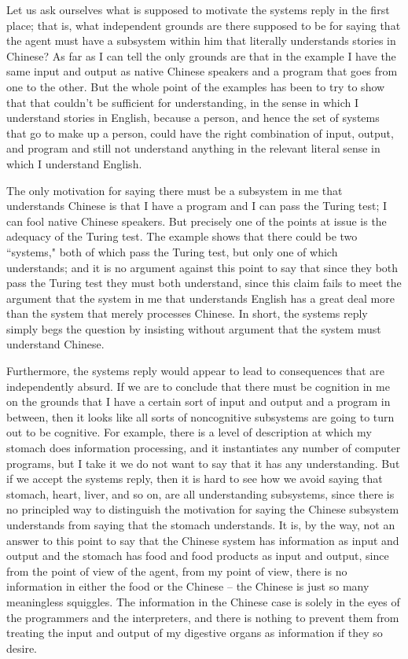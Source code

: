 Let us ask ourselves what is supposed to motivate the systems reply in the first place; that is, what independent
grounds are there supposed to be for saying that the agent must have a subsystem within him that literally
understands stories in Chinese? As far as I can tell the only grounds are that in the example I have the same
input and output as native Chinese speakers and a program that goes from one to the other. But the whole
point of the examples has been to try to show that that couldn't be sufficient for understanding, in the sense in
which I understand stories in English, because a person, and hence the set of systems that go to make up a
person, could have the right combination of input, output, and program and still not understand anything in the
relevant literal sense in which I understand English.

The only motivation for saying there must be a subsystem in me that understands Chinese is that I have a
program and I can pass the Turing test; I can fool native Chinese speakers. But precisely one of the points at
issue is the adequacy of the Turing test. The example shows that there could be two ``systems," both of which
pass the Turing test, but only one of which understands; and it is no argument against this point to say that since
they both pass the Turing test they must both understand, since this claim fails to meet the argument that the
system in me that understands English has a great deal more than the system that merely processes Chinese. In
short, the systems reply simply begs the question by insisting without argument that the system must understand
Chinese.

Furthermore, the systems reply would appear to lead to consequences that are independently absurd. If we are
to conclude that there must be cognition in me on the grounds that I have a certain sort of input and output and a
program in between, then it looks like all sorts of noncognitive subsystems are going to turn out to be cognitive.
For example, there is a level of description at which my stomach does information processing, and it instantiates
any number of computer programs, but I take it we do not want to say that it has any understanding\autocite{Pylyshyn1}. But if we accept the systems reply, then it is hard to
see how we avoid saying that stomach, heart, liver, and so on, are all understanding subsystems, since there is
no principled way to distinguish the motivation for saying the Chinese subsystem understands from saying that
the stomach understands. It is, by the way, not an answer to this point to say that the Chinese system has
information as input and output and the stomach has food and food products as input and output, since from the
point of view of the agent, from my point of view, there is no information in either the food or the Chinese -- the
Chinese is just so many meaningless squiggles. The information in the Chinese case is solely in the eyes of the
programmers and the interpreters, and there is nothing to prevent them from treating the input and output of my
digestive organs as information if they so desire.

